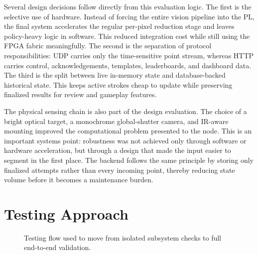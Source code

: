 \documentclass[10pt,a4paper]{article}
\begin{document}
Several design decisions follow directly from this evaluation logic. The first
is the selective use of hardware. Instead of forcing the entire vision pipeline
into the PL, the final system accelerates the regular per-pixel reduction stage
and leaves policy-heavy logic in software. This reduced integration cost while
still using the FPGA fabric meaningfully. The second is the separation of
protocol responsibilities: UDP carries only the time-sensitive point stream,
whereas HTTP carries control, acknowledgements, templates, leaderboards, and
dashboard data. The third is the split between live in-memory state and
database-backed historical state. This keeps active strokes cheap to update
while preserving finalized results for review and gameplay features.

The physical sensing chain is also part of the design evaluation. The choice of
a bright optical target, a monochrome global-shutter camera, and IR-aware
mounting improved the computational problem presented to the node. This is an
important systems point: robustness was not achieved only through software or
hardware acceleration, but through a design that made the input easier to
segment in the first place. The backend follows the same principle by storing
only finalized attempts rather than every incoming point, thereby reducing
state volume before it becomes a maintenance burden.

\section{Testing Approach}

\begin{figure}[t]
\centering
{}
\caption{Testing flow used to move from isolated subsystem checks to full
end-to-end validation.}
\label{fig:test-flow}
\end{figure}
\end{document}

